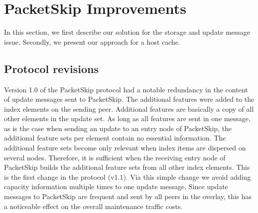 \section{PacketSkip Improvements}
\label{sec:solution}

In this section, we first describe our solution for the storage and update message issue. Secondly, we present our approach for a host cache.

\subsection{Protocol revisions}
\label{subsec:revisions}

Version 1.0 of the PacketSkip protocol had a notable redundancy in the content of update messages sent to PacketSkip. 
The additional features were added to the index elements on the sending peer. Additional features are basically a copy of all other elements in the update set. As long as all features are sent in one message, as is the case when sending an update to an entry node of PacketSkip, the additional feature sets per element contain no essential information. The additional feature sets become only relevant when index items are dispersed on several nodes. Therefore, it is sufficient when the receiving entry node of PacketSkip builds the additional feature sets from all other index elements. This is the first change in the protocol (v1.1). Via this simple change we avoid adding capacity information multiple times to one update message. Since update messages to PacketSkip are frequent and sent by all peers in the overlay, this has a noticeable effect on the overall maintenance traffic costs.

